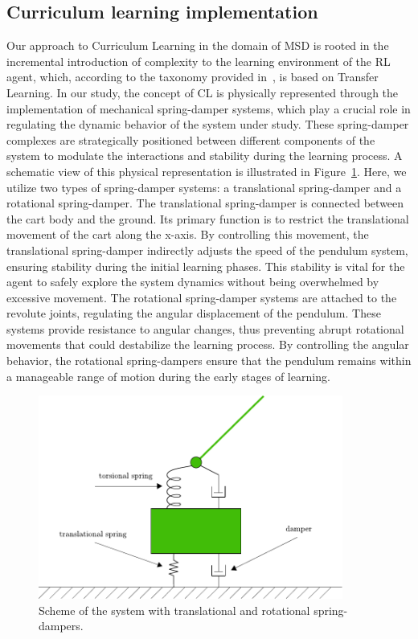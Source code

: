 \subsection{Curriculum learning implementation} \label{Curriculum learning implementation}
Our approach to Curriculum Learning in the domain of MSD is rooted in the incremental introduction of complexity to the learning environment of the RL agent, which, according to the taxonomy provided in~\cite{narvekar2020survey}, is based on Transfer Learning.
In our study, the concept of CL is physically represented through the implementation of mechanical spring-damper systems, which play a crucial role in regulating the dynamic behavior of the system under study. These spring-damper complexes are strategically positioned between different components of the system to modulate the interactions and stability during the learning process. A schematic view of this physical representation is illustrated in Figure~\ref{fig: cl mechanical implementation}. Here, we utilize two types of spring-damper systems: a translational spring-damper and a rotational spring-damper. The translational spring-damper is connected between the cart body and the ground. Its primary function is to restrict the translational movement of the cart along the x-axis. By controlling this movement, the translational spring-damper indirectly adjusts the speed of the pendulum system, ensuring stability during the initial learning phases. This stability is vital for the agent to safely explore the system dynamics without being overwhelmed by excessive movement. The rotational spring-damper systems are attached to the revolute joints, regulating the angular displacement of the pendulum. These systems provide resistance to angular changes, thus preventing abrupt rotational movements that could destabilize the learning process. By controlling the angular behavior, the rotational spring-dampers ensure that the pendulum remains within a manageable range of motion during the early stages of learning.

\begin{figure}[h]
	\centering
	\includegraphics[width=10cm]{Figures/cl_mech_implementation.pdf}
	\caption{Scheme of the system with translational and rotational spring-dampers.}
	\label{fig: cl mechanical implementation}
\end{figure}

